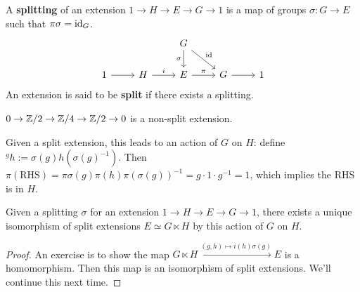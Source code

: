 \begin{definition}[]
    A \textbf{splitting} of an extension $1 \to H\to E\to G\to 1$ is a map of groups $\sigma \colon G \to E$ such that $\pi \sigma=\operatorname{id} _G$. \[
    \begin{tikzcd}
            &                  & G \arrow[d, "\sigma"'] \arrow[rd, "\id"] &             &   \\
1 \arrow[r] & H \arrow[r, "i"] & E \arrow[r, "\pi"]                       & G \arrow[r] & 1
\end{tikzcd}
    \] An extension is said to be \textbf{split} if there exists a splitting.
\end{definition}
\begin{example}
    $0 \to  \mathbb{Z} /2 \to  \mathbb{Z} /4 \to \mathbb{Z} /2 \to 0$ is a non-split extension.
\end{example}
Given a split extension, this leads to an action of $G$ on $H$: define ${}^gh :=\sigma(g)h(\sigma(g) ^{-1})$. Then $\pi(\text{RHS} ) = \pi \sigma(g) \pi(h) \pi(\sigma(g)) ^{-1}=g \cdot 1\cdot g ^{-1}=1$, which implies the RHS is in $H$.
\begin{lemma}
    Given a splitting $\sigma$ for an extension $1 \to  H \to  E \to  G \to  1$, there exists a unique isomorphism of split extensions $ E \simeq  G \ltimes H$ by this action of $G$ on $H$.
\end{lemma}
\begin{proof}
    An exercise is to show the map $G\ltimes H \xrightarrow{(g,h) \mapsto  i(h)\sigma(g)} E$ is a homomorphism. Then this map is an isomorphism of split extensions. We'll continue this next time.
\end{proof}
